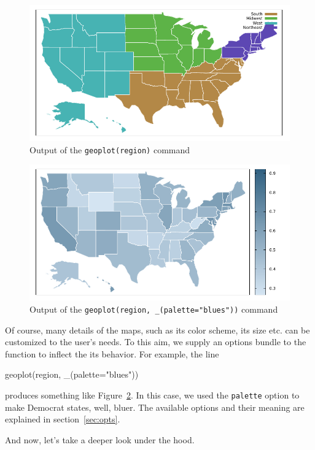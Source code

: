 \documentclass{article}
\begin{document}
\begin{figure}[htbp]
  \centering
  \includegraphics[scale=0.75]{us2020-reg}
  \caption{Output of the \texttt{geoplot(region)} command}
  \label{fig:us2020-reg}
\end{figure}

\begin{figure}[htbp]
  \centering
  \includegraphics[scale=0.75]{us2020-dem}
  \caption{Output of the \texttt{geoplot(region, \_(palette="blues"))} command}
  \label{fig:us2020-dem}
\end{figure}
Of course, many details of the maps, such as its color scheme, its
size etc. can be customized to the user's needs. To this aim, we
supply an options bundle to the  function to inflect the
its behavior. For example, the line
\begin{code}
  geoplot(region, _(palette="blues"))
\end{code}
produces something like Figure~\ref{fig:us2020-dem}. In this case, we
used the \texttt{palette} option to make Democrat states, well,
bluer. The available options and their meaning are explained in
section~\ref{sec:opts}.

And now, let's take a deeper look under the hood.
\end{document}

